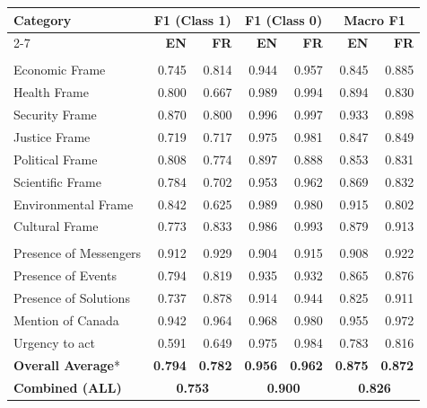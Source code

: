 \begin{tabular}{l|rr|rr|rr}
\toprule
\rowcolor{gray!10}
\textbf{Category} & \multicolumn{2}{c}{\textbf{F1 (Class 1)}} & \multicolumn{2}{c}{\textbf{F1 (Class 0)}} & \multicolumn{2}{c}{\textbf{Macro F1}} \\
\cline{2-7}
\rowcolor{gray!10}
& \textbf{EN} & \textbf{FR} & \textbf{EN} & \textbf{FR} & \textbf{EN} & \textbf{FR} \\
\midrule
\rowcolor{gray!10}
\multicolumn{7}{l}{\textit{Main Frames}} \\
\midrule
Economic Frame & 0.745 & 0.814 & 0.944 & 0.957 & 0.845 & 0.885 \\
Health Frame & 0.800 & 0.667 & 0.989 & 0.994 & 0.894 & 0.830 \\
Security Frame & 0.870 & 0.800 & 0.996 & 0.997 & 0.933 & 0.898 \\
Justice Frame & 0.719 & 0.717 & 0.975 & 0.981 & 0.847 & 0.849 \\
Political Frame & 0.808 & 0.774 & 0.897 & 0.888 & 0.853 & 0.831 \\
Scientific Frame & 0.784 & 0.702 & 0.953 & 0.962 & 0.869 & 0.832 \\
Environmental Frame & 0.842 & 0.625 & 0.989 & 0.980 & 0.915 & 0.802 \\
Cultural Frame & 0.773 & 0.833 & 0.986 & 0.993 & 0.879 & 0.913 \\
\midrule
\rowcolor{gray!10}
\multicolumn{7}{l}{\textit{Other Primary Categories: Actors, Events and Solutions}} \\
\midrule
Presence of Messengers & 0.912 & 0.929 & 0.904 & 0.915 & 0.908 & 0.922 \\
Presence of Events & 0.794 & 0.819 & 0.935 & 0.932 & 0.865 & 0.876 \\
Presence of Solutions & 0.737 & 0.878 & 0.914 & 0.944 & 0.825 & 0.911 \\
Mention of Canada & 0.942 & 0.964 & 0.968 & 0.980 & 0.955 & 0.972 \\
Urgency to act & 0.591 & 0.649 & 0.975 & 0.984 & 0.783 & 0.816 \\
\midrule
\rowcolor{gray!15}
\textbf{Overall Average}* & \textbf{0.794} & \textbf{0.782} & \textbf{0.956} & \textbf{0.962} & \textbf{0.875} & \textbf{0.872} \\
\rowcolor{gray!15}
\textbf{Combined (ALL)} & \multicolumn{2}{c}{\textbf{0.753}} & \multicolumn{2}{c}{\textbf{0.900}} & \multicolumn{2}{c}{\textbf{0.826}} \\
\bottomrule
\end{tabular}